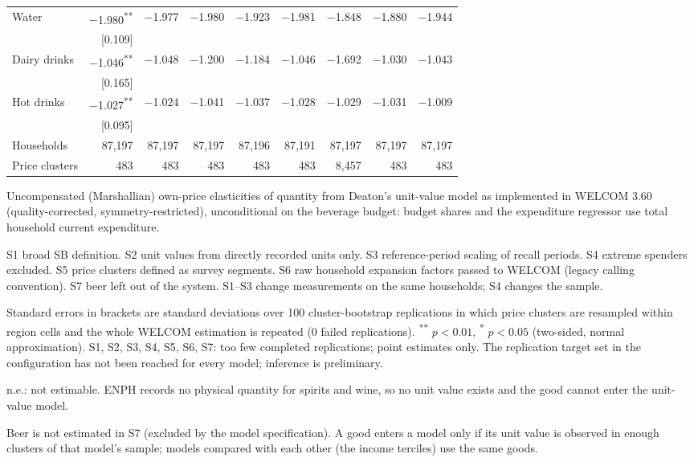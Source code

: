 \begin{table}[!htbp]
\begin{threeparttable}
\begin{tabular}{lrrrrrrrr}
Water & $-$1.980\textsuperscript{**} & $-$1.977 & $-$1.980 & $-$1.923 & $-$1.981 & $-$1.848 & $-$1.880 & $-$1.944 \\
 & [0.109] &  &  &  &  &  &  &  \\
Dairy drinks & $-$1.046\textsuperscript{**} & $-$1.048 & $-$1.200 & $-$1.184 & $-$1.046 & $-$1.692 & $-$1.030 & $-$1.043 \\
 & [0.165] &  &  &  &  &  &  &  \\
Hot drinks & $-$1.027\textsuperscript{**} & $-$1.024 & $-$1.041 & $-$1.037 & $-$1.028 & $-$1.029 & $-$1.031 & $-$1.009 \\
 & [0.095] &  &  &  &  &  &  &  \\
\addlinespace
Households & 87,197 & 87,197 & 87,197 & 87,196 & 87,191 & 87,197 & 87,197 & 87,197 \\
Price clusters & 483 & 483 & 483 & 483 & 483 & 8,457 & 483 & 483 \\
\bottomrule
\end{tabular}
\begin{tablenotes}[flushleft]
\footnotesize
\item Uncompensated (Marshallian) own-price elasticities of quantity from Deaton's unit-value model as implemented in WELCOM 3.60 (quality-corrected, symmetry-restricted), unconditional on the beverage budget: budget shares and the expenditure regressor use total household current expenditure.
\item S1 broad SB definition. S2 unit values from directly recorded units only. S3 reference-period scaling of recall periods. S4 extreme spenders excluded. S5 price clusters defined as survey segments. S6 raw household expansion factors passed to WELCOM (legacy calling convention). S7 beer left out of the system. S1--S3 change measurements on the same households; S4 changes the sample.
\item Standard errors in brackets are standard deviations over 100 cluster-bootstrap replications in which price clusters are resampled within region cells and the whole WELCOM estimation is repeated (0 failed replications). \textsuperscript{**} $p<0.01$, \textsuperscript{*} $p<0.05$ (two-sided, normal approximation). S1, S2, S3, S4, S5, S6, S7: too few completed replications; point estimates only. The replication target set in the configuration has not been reached for every model; inference is preliminary.
\item n.e.: not estimable. ENPH records no physical quantity for spirits and wine, so no unit value exists and the good cannot enter the unit-value model.
\item Beer is not estimated in S7 (excluded by the model specification). A good enters a model only if its unit value is observed in enough clusters of that model's sample; models compared with each other (the income terciles) use the same goods.
\end{tablenotes}
\end{threeparttable}
\end{table}
